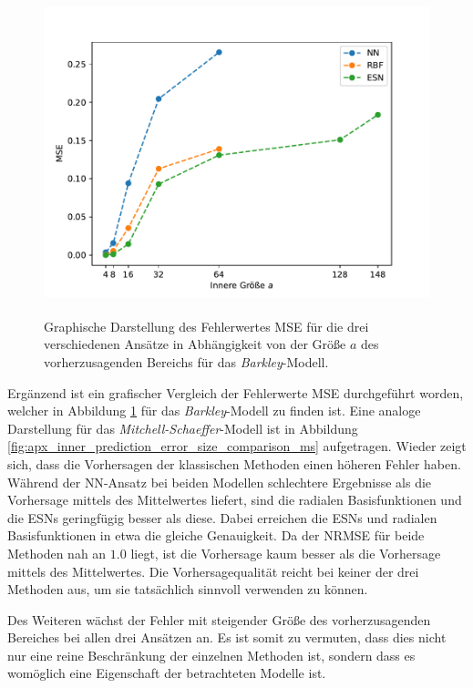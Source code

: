 \begin{figure}[H]
	\centering
	\includegraphics[height=3.7in]{figures/results/inner_cross_prediction/barkley_error_size_comparison.pdf}
	\caption{Graphische Darstellung des Fehlerwertes MSE für die drei verschiedenen Ansätze in Abhängigkeit von der Größe $a$ des vorherzusagenden Bereichs für das \textit{Barkley}-Modell.}
	\label{fig:inner_prediction_error_size_comparison_barkley}
\end{figure}
 
Ergänzend ist ein grafischer Vergleich der Fehlerwerte MSE durchgeführt worden, welcher in Abbildung \ref{fig:inner_prediction_error_size_comparison_barkley} für das \textit{Barkley}-Modell zu finden ist. Eine analoge Darstellung für das \textit{Mitchell-Schaeffer}-Modell ist in Abbildung \ref{fig:apx_inner_prediction_error_size_comparison_ms} aufgetragen. Wieder zeigt sich, dass die Vorhersagen der klassischen Methoden einen höheren Fehler haben. Während der \textsc{NN}-Ansatz bei beiden Modellen schlechtere Ergebnisse als die Vorhersage mittels des Mittelwertes liefert, sind die radialen Basisfunktionen und die \textsc{ESN}s geringfügig besser als diese. Dabei erreichen die \textsc{ESN}s und radialen Basisfunktionen in etwa die gleiche Genauigkeit. Da der NRMSE für beide Methoden nah an $1.0$ liegt, ist die Vorhersage kaum besser als die Vorhersage mittels des Mittelwertes. Die Vorhersagequalität reicht bei keiner der drei Methoden aus, um sie tatsächlich sinnvoll verwenden zu können. 

Des Weiteren wächst der Fehler mit steigender Größe des vorherzusagenden Bereiches bei allen drei Ansätzen an. Es ist somit zu vermuten, dass dies nicht nur eine reine Beschränkung der einzelnen Methoden ist, sondern dass es womöglich eine Eigenschaft der betrachteten Modelle ist. 

